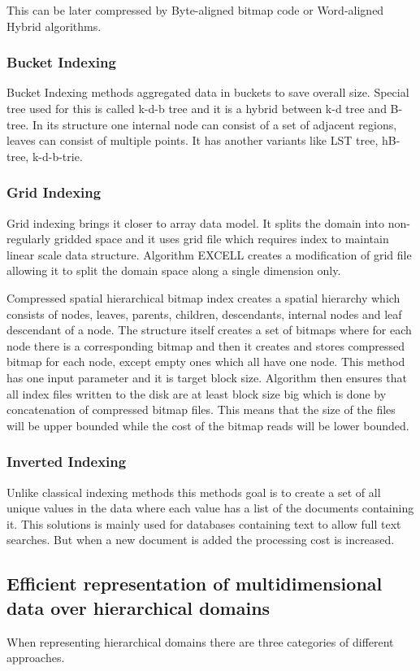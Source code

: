 This can be later compressed by Byte-aligned bitmap code or Word-aligned Hybrid algorithms. 
\subsubsection{Bucket Indexing}
Bucket Indexing methods aggregated data in buckets to save overall size. Special tree used for this is called k-d-b tree and it is a hybrid between k-d tree and B-tree. In its structure one internal node can consist of a set of adjacent regions, leaves can consist of multiple points. It has another variants like LST tree, hB-tree, k-d-b-trie.
\subsubsection{Grid Indexing}
Grid indexing brings it closer to array data model. It splits the domain into non-regularly gridded space and it uses grid file which requires index to maintain linear scale data structure. Algorithm EXCELL creates a modification of grid file allowing it to split the domain space along a single dimension only.

Compressed spatial hierarchical bitmap index \cite{cSHB} creates a spatial hierarchy which consists of nodes, leaves, parents, children, descendants, internal nodes and leaf descendant of a node. The structure itself creates a set of bitmaps where for each node there is a corresponding bitmap and then it creates and stores compressed bitmap for each node, except empty ones which all have one node. This method has one input parameter and it is target block size. Algorithm then ensures that all index files written to the disk are at least block size big which is done by concatenation of compressed bitmap files. This means that the size of the files will be upper bounded while the cost of the bitmap reads will be lower bounded.

\subsubsection{Inverted Indexing}
Unlike classical indexing methods this methods goal is to create a set of all unique values in the data where each value has a list of the documents containing it. This solutions is mainly used for databases containing text to allow full text searches. But when a new document is added the processing cost is increased. \cite{invertIndex}


\subsection{Efficient representation of multidimensional data over hierarchical domains}
When representing hierarchical domains there are three categories of different approaches.

